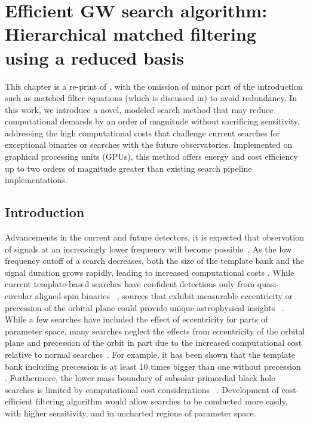 \chapter{Efficient GW search algorithm: Hierarchical matched filtering using a reduced basis}

This chapter is a re-print of \cite{Dhurkunde:2021csz}, with the omission of minor part of the introduction such as matched filter equations (which is discussed in) to avoid redundancy. In this work, we introduce a novel, modeled search method that may reduce computational demands by an order of magnitude without sacrificing sensitivity, addressing the high computational costs that challenge current searches for exceptional binaries or searches with the future observatories. Implemented on graphical processing units (GPUs), this method offers energy and cost efficiency up to two orders of magnitude greater than existing search pipeline implementations.

\section{Introduction}
Advancements in the current and future detectors, it is expected that observation of signals at an increasingly lower frequency will become possible~\cite{ET_data_analysis, ET, LISA-newsources, CE-newsources, 3g_sensitivity}. As the low frequency cutoff of a search decreases, both the size of the template bank and the signal duration grows rapidly, leading to increased computational costs \cite{ET_data_analysis, Nitz_ecc_search, LIGO_subsolar}. While current template-based searches have confident detections only from quasi-circular aligned-spin binaries ~\cite{gstlal_offline, 2ogc, GWTC2, mbta_latest}, sources that exhibit measurable eccentricity or precession of the orbital plane could provide unique astrophysical insights ~\cite{Prospects_eccentricity, Prospects_precession}. While a few searches have included the effect of eccentricity \cite{LIGO_ecc_search, Nitz_ecc_search, Lennon_ecc_search} for parts of parameter space, many searches neglect the effects from eccentricity of the orbital plane \cite{eccentricity} and precession of the orbit \cite{precession} in part due to the increased computational cost relative to normal searches~\cite{ianharry_precession, Nitz_ecc_search, Nitz:2021uxj, LIGO_subsolar}. For example, it has been shown that the template bank including precession is at least 10 times bigger than one without precession \cite{ianharry_precession}. %
Furthermore, the lower mass boundary of subsolar primordial black hole searches is limited by computational cost considerations ~\cite{LIGO_subsolar, ET_data_analysis, Nitz_ecc_search, Nitz:2021uxj}. Development of cost-efficient filtering algorithm would allow searches to be conducted more easily, with higher sensitivity, and in uncharted regions of parameter space. 


